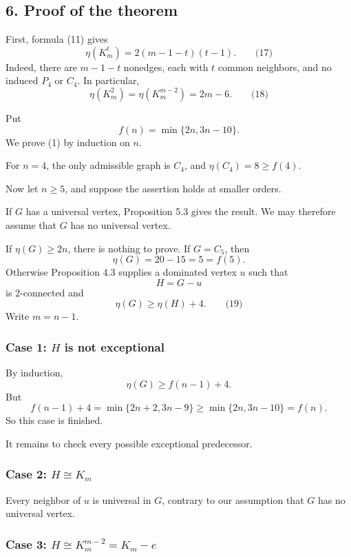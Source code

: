 \documentclass[
  11pt,
  a4paper,
]{article}
\newcounter{none} %
\begin{document}
\subsection{6. Proof of the theorem}\label{proof-of-the-theorem}

First, formula (11) gives \[
\boxed{\eta(K_m^t)=2(m-1-t)(t-1).}
\qquad\text{(17)}
\] Indeed, there are \(m-1-t\) nonedges, each with \(t\) common
neighbors, and no induced \(P_4\) or \(C_4\). In particular, \[
\eta(K_m^2)=\eta(K_m^{m-2})=2m-6.
\qquad\text{(18)}
\]

Put \[
f(n)=\min\{2n,3n-10\}.
\] We prove (1) by induction on \(n\).

For \(n=4\), the only admissible graph is \(C_4\), and
\(\eta(C_4)=8\ge f(4)\).

Now let \(n\ge5\), and suppose the assertion holds at smaller orders.

If \(G\) has a universal vertex, Proposition 5.3 gives the result. We
may therefore assume that \(G\) has no universal vertex.

If \(\eta(G)\ge2n\), there is nothing to prove. If \(G=C_5\), then \[
\eta(G)=20-15=5=f(5).
\] Otherwise Proposition 4.3 supplies a dominated vertex \(u\) such that
\[
H=G-u
\] is 2-connected and \[
\eta(G)\ge\eta(H)+4.
\qquad\text{(19)}
\] Write \(m=n-1\).

\subsubsection{\texorpdfstring{Case 1: \(H\) is not
exceptional}{Case 1: H is not exceptional}}\label{case-1-h-is-not-exceptional}

By induction, \[
\eta(G)\ge f(n-1)+4.
\] But \[
f(n-1)+4
=\min\{2n+2,3n-9\}
\ge\min\{2n,3n-10\}=f(n).
\] So this case is finished.

It remains to check every possible exceptional predecessor.

\subsubsection{\texorpdfstring{Case 2:
\(H\cong K_m\)}{Case 2: H\textbackslash cong K\_m}}\label{case-2-hcong-k_m}

Every neighbor of \(u\) is universal in \(G\), contrary to our
assumption that \(G\) has no universal vertex.

\subsubsection{\texorpdfstring{Case 3:
\(H\cong K_m^{m-2}=K_m-e\)}{Case 3: H\textbackslash cong K\_m\^{}\{m-2\}=K\_m-e}}\label{case-3-hcong-k_mm-2k_m-e}
\end{document}
